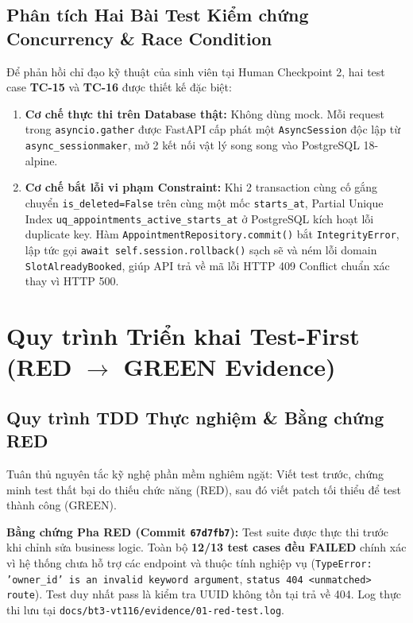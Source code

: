 \documentclass[10pt,a4paper]{article}
\newcommand{\codepath}[1]{{\ttfamily\scriptsize\nolinkurl{#1}}}
\begin{document}
\subsection{Phân tích Hai Bài Test Kiểm chứng Concurrency \& Race Condition}
Để phản hồi chỉ đạo kỹ thuật của sinh viên tại Human Checkpoint 2, hai test case \textbf{TC-15} và \textbf{TC-16} được thiết kế đặc biệt:
\begin{enumerate}[leftmargin=1.1em,itemsep=0.3pt]
  \item \textbf{Cơ chế thực thi trên Database thật:} Không dùng mock. Mỗi request trong \texttt{asyncio.gather} được FastAPI cấp phát một \texttt{AsyncSession} độc lập từ \texttt{async\_sessionmaker}, mở 2 kết nối vật lý song song vào PostgreSQL 18-alpine.
  \item \textbf{Cơ chế bắt lỗi vi phạm Constraint:} Khi 2 transaction cùng cố gắng chuyển \texttt{is\_deleted=False} trên cùng một mốc \texttt{starts\_at}, Partial Unique Index \texttt{uq\_appointments\_active\_starts\_at} ở PostgreSQL kích hoạt lỗi duplicate key. Hàm \codepath{AppointmentRepository.commit()} bắt \texttt{IntegrityError}, lập tức gọi \texttt{await self.session.rollback()} sạch sẽ và ném lỗi domain \texttt{SlotAlreadyBooked}, giúp API trả về mã lỗi HTTP 409 Conflict chuẩn xác thay vì HTTP 500.
\end{enumerate}

\clearpage
\section{Quy trình Triển khai Test-First (RED $\rightarrow$ GREEN Evidence)}

\subsection{Quy trình TDD Thực nghiệm \& Bằng chứng RED}
Tuân thủ nguyên tắc kỹ nghệ phần mềm nghiêm ngặt: Viết test trước, chứng minh test thất bại do thiếu chức năng (RED), sau đó viết patch tối thiểu để test thành công (GREEN).

\begin{notebox}
\textbf{Bằng chứng Pha RED (Commit \texttt{67d7fb7}):}
Test suite được thực thi trước khi chỉnh sửa business logic. Toàn bộ \textbf{12/13 test cases đều FAILED} chính xác vì hệ thống chưa hỗ trợ các endpoint và thuộc tính nghiệp vụ (\texttt{TypeError: 'owner\_id' is an invalid keyword argument}, \texttt{status 404 <unmatched> route}). Test duy nhất pass là kiểm tra UUID không tồn tại trả về 404. Log thực thi lưu tại \codepath{docs/bt3-vt116/evidence/01-red-test.log}.
\end{notebox}
\end{document}
